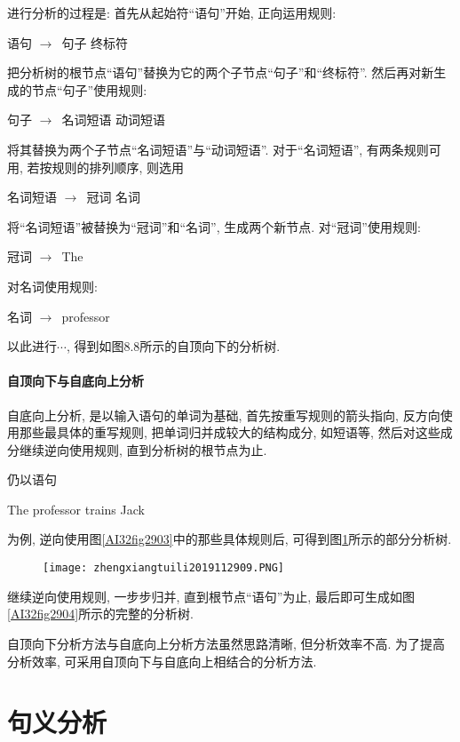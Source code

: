 进行分析的过程是:
    首先从起始符“语句”开始, 正向运用规则:
\begin{center}
    语句 $\rightarrow$\,  句子   终标符
\end{center}
把分析树的根节点“语句”替换为它的两个子节点“句子”和“终标符”.
    然后再对新生成的节点“句子”使用规则:
\begin{center}
    句子 $\rightarrow$\,  名词短语   动词短语
\end{center}
将其替换为两个子节点“名词短语”与“动词短语”.
    对于“名词短语”, 有两条规则可用, 若按规则的排列顺序, 则选用
\begin{center}
    名词短语 $\rightarrow$\,  冠词    名词
\end{center}
将“名词短语”被替换为“冠词”和“名词”, 生成两个新节点. 对“冠词”使用规则:
\begin{center}
    冠词 $\rightarrow$\,  The
\end{center}
对名词使用规则:
\begin{center}
    名词 $\rightarrow$\,  professor
\end{center}
以此进行$\cdots$, 得到如图8.8所示的自顶向下的分析树.
\paragraph{自顶向下与自底向上分析}
自底向上分析, 是以输入语句的单词为基础, 首先按重写规则的箭头指向, 反方向使用那些最具体的重写规则, 把单词归并成较大的结构成分, 如短语等, 然后对这些成分继续逆向使用规则, 直到分析树的根节点为止.

仍以语句
\begin{center}
  The  professor  trains  Jack
\end{center}
为例, 逆向使用图\ref{AI32fig2903}中的那些具体规则后, 可得到图\ref{AI32fig2909}所示的部分分析树.
\begin{figure}[H]
\centering
\texttt{[image: zhengxiangtuili2019112909.PNG]}
\caption{}
\label{AI32fig2909}
\end{figure}

继续逆向使用规则, 一步步归并, 直到根节点“语句”为止, 最后即可生成如图\ref{AI32fig2904}所示的完整的分析树.

自顶向下分析方法与自底向上分析方法虽然思路清晰, 但分析效率不高. 为了提高分析效率, 可采用自顶向下与自底向上相结合的分析方法.

\section{句义分析}

